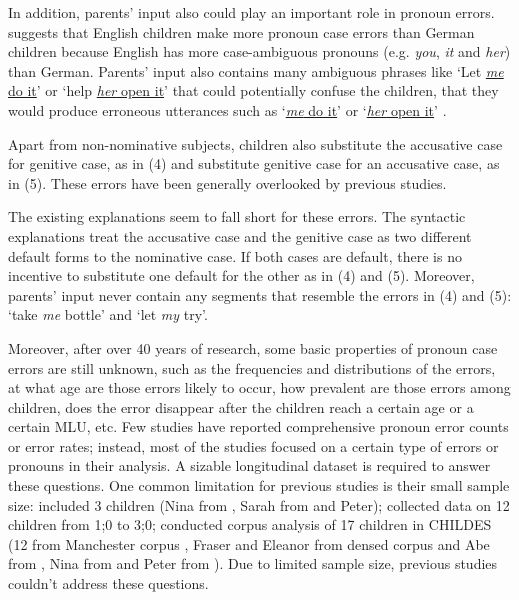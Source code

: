 In addition, parents' input also could play an important role in pronoun errors. \cite{pelham2011input} suggests that English children make more pronoun case errors than German children because English has more case-ambiguous pronouns (e.g. \textit{you}, \textit{it} and \textit{her}) than German. Parents' input also contains many ambiguous phrases like `Let \underline{\textit{me} do it}' or `help \underline{\textit{her} open it}' that could potentially confuse the children, that they would produce erroneous utterances such as `\underline{\textit{me} do it}' or `\underline{\textit{her} open it}' \citep{tomasello2000, kirjavainen2009can}.  




Apart from non-nominative subjects, children also substitute the accusative case for genitive case, as in (4) and substitute genitive case for an accusative case, as in (5). These errors have been generally overlooked by previous studies.
\begin{exe}
\end{exe}
The existing explanations seem to fall short for these errors. The syntactic explanations treat the accusative case and the genitive case as two different default forms to the nominative case. If both cases are default, there is no incentive to substitute one default for the other as in (4) and (5). Moreover, parents' input never contain any segments that resemble the errors in (4) and (5): `take \textit{me} bottle' and `let \textit{my} try'. 

Moreover, after over 40 years of research, some basic properties of pronoun case errors are still unknown, such as the frequencies and distributions of the errors, at what age are those errors likely to occur, how prevalent are those errors among children, does the error disappear after the children reach a certain age or a certain MLU, etc. Few studies have reported comprehensive pronoun error counts or error rates; instead, most of the studies focused on a certain type of errors or pronouns in their analysis. A sizable longitudinal dataset is required to answer these questions. One common limitation for previous studies is their small sample size: \cite{schutze1996subject} included 3 children (Nina from \citep{suppes1974semantics}, Sarah from \citep{brown1973first} and Peter\citep{bloom1974imitation}); \cite{rispoli1998} collected data on 12 children from 1;0 to 3;0; \cite{kirjavainen2009can} conducted corpus analysis of 17 children in CHILDES (12 from Manchester corpus \cite{theakston2001}, Fraser and Eleanor from densed corpus \citep{rowland2006effect} and Abe from \cite{kuczaj1977acquisition}, Nina from \citep{suppes1974semantics} and Peter from \citep{bloom1974imitation}). Due to limited sample size, previous studies couldn't address these questions. 

